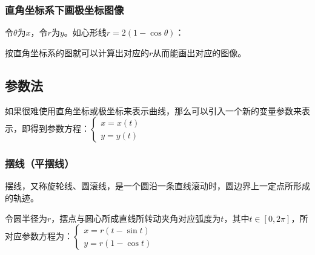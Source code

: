 \documentclass[UTF8, 12pt]{ctexart}
\begin{document}
        \subsubsection{直角坐标系下画极坐标图像}

        \begin{minipage}{0.5\linewidth}
            令$\theta$为$x$，令$r$为$y$。如心形线$r=2(1-\cos\theta)$：

            按直角坐标系的图就可以计算出对应的$r$从而能画出对应的图像。
        \end{minipage}
        \hfill
        \begin{minipage}{0.4\linewidth}
        \end{minipage}

        \subsection{参数法}

        如果很难使用直角坐标或极坐标来表示曲线，那么可以引入一个新的变量参数来表示，即得到参数方程：$
        \left\{
        \begin{array}{lcl}
            x=x(t) \\
            y=y(t)
        \end{array}
        \right.
        $

        \subsubsection{摆线（平摆线）}

        摆线，又称旋轮线、圆滚线，是一个圆沿一条直线滚动时，圆边界上一定点所形成的轨迹。

        令圆半径为$r$，摆点与圆心所成直线所转动夹角对应弧度为$t$，其中$t\in[0,2\pi]$，所对应参数方程为：$
        \left\{
        \begin{array}{lcl}
            x=r(t-\sin t) \\
            y=r(1-\cos t)
        \end{array}
        \right.
        $
\end{document}

